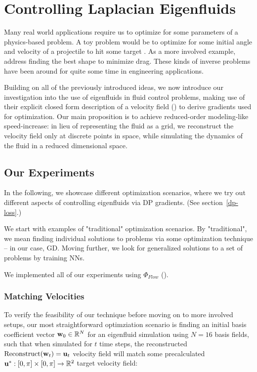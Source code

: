 \chapter{Controlling Laplacian Eigenfluids}
Many real world applications require us to optimize for some parameters of
a physics-based problem. A toy problem would be to optimize for some initial
angle and velocity of a projectile to hit some target . As a more involved example, \cite{MinDrag} address
finding the best shape to minimize drag. These kinds of inverse problems have
been around for quite some time in engineering applications.

Building on all of the previously introduced ideas, we now introduce our
investigation into the use of eigenfluids in fluid control problems, making use
of their explicit closed form description of a velocity field () to derive gradients used for optimization. Our main proposition is to
achieve reduced-order modeling-like speed-increase: in lieu of representing the
fluid as a grid, we reconstruct the velocity field only at discrete points in
space, while simulating the dynamics of the fluid in a reduced dimensional
space.

\section{Our Experiments}
In the following, we showcase different optimization scenarios, where we try out
different aspects of controlling eigenfluids via \acf{DP} gradients. (See
section~\ref{dp-loss}.)

We start with examples of "traditional" optimization scenarios. By
"traditional", we mean finding individual solutions to problems via some
optimization technique -- in our case, \acf{GD}. Moving further, we look for
generalized solutions to a set of problems by training \acfp{NN}.

We implemented all of our experiments using $\Phi_{Flow}$
(\cite{holl2019pdecontrol}).

\subsection{Matching Velocities}\label{section:matching-velocities}
To verify the feasibility of our technique before moving on to more involved
setups, our most straightforward optimziation scenario is finding an initial
basis coefficient vector $\vb{w}_0 \in \mathbb{R}^N$ for an eigenfluid
simulation using $N=16$ basis fields, such that when simulated for $t$ time
steps, the reconstructed $\text{Reconstruct}(\vb{w}_t) = \vb{u}_t$ velocity
field will match some precalculated $\vb{u}^*: [0,\pi]\times[0,\pi] \to
\mathbb{R}^2$ target velocity field:

